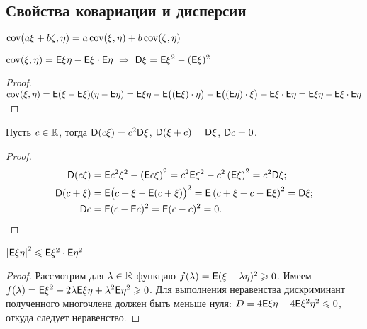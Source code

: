 \subsection*{Свойства ковариации и дисперсии}
\setcounter{property}{0}
\begin{property}
	$\operatorname{cov}( a \xi + b \zeta, \eta ) = a \operatorname{cov} (\xi, \eta) + b \operatorname{cov} (\zeta, \eta)$
\end{property}
\begin{property}
	$\operatorname{cov}( \xi,  \eta ) = \mathsf{E} \xi \eta - \mathsf{E} \xi \cdot \mathsf{E} \eta ~\Rightarrow ~ \mathsf{D} \xi = \mathsf{E} \xi^2 - ( \mathsf{E} \xi )^2$
	\begin{proof}
		$\operatorname{cov} (\xi, \eta ) = \mathsf{E} (\xi - \mathsf{E} \xi)( \eta - \mathsf{E} \eta) = \mathsf{E} \xi \eta - \mathsf{E} \big( ( \mathsf{E} \xi ) \cdot \eta \big) - \mathsf{E} \big( (\mathsf{E} \eta ) \cdot \xi \big) + \mathsf{E} \xi \cdot \mathsf{E} \eta = \mathsf{E} \xi \eta - \mathsf{E} \xi \cdot \mathsf{E} \eta $
	\end{proof}
\end{property}
\begin{property}
	Пусть $c \in \mathbb{R}$, тогда $\mathsf{D} (c \xi ) = c^2 \mathsf{D} \xi$, $\mathsf{D} (\xi + c ) =  \mathsf{D} \xi$, $\mathsf{D} c = 0$.
	\begin{proof}
		\vspace{-2pc}
		\begin{align*}
			\mathsf{D} (c \xi ) &= \mathsf{E} c^2 \xi^2 - \left( \mathsf{E} c \xi \right)^2 = c^2 \mathsf{E} \xi^2 - c^2 \left( \mathsf{E} \xi \right)^2 = c^2 \mathsf{D} \xi;\\
			\mathsf{D} ( c + \xi ) &= \mathsf{E} \big( c + \xi - \mathsf{E} ( c + \xi ) \big)^2 = \mathsf{E} \left( c + \xi - c - \mathsf{E} \xi  \right)^2 = \mathsf{D} \xi; \\
			\mathsf{D} c &= \mathsf{E} (c - \mathsf{E} c )^2 = \mathsf{E} (c - c)^2 = 0. \qedhere
		\end{align*} 
	\end{proof}
\end{property}
\begin{property}
	$\left| \mathsf{E} \xi \eta \right|^2 \leqslant \mathsf{E} \xi^2 \cdot \mathsf{E} \eta^2$
	\begin{proof}
		Рассмотрим для $\lambda \in \mathbb{R}$ функцию $f( \lambda ) = \mathsf{E} (\xi - \lambda \eta)^2 \geqslant 0$. Имеем $f( \lambda ) = \mathsf{E} \xi^2 + 2 \lambda \mathsf{E} \xi \eta + \lambda^2 \mathsf{E} \eta^2 \geqslant 0$. Для выполнения неравенства дискриминант  полученного многочлена должен быть меньше нуля: $D = 4 \mathsf{E} \xi \eta - 4 \mathsf{E} \xi^2 \eta^2 \leqslant 0$, откуда следует неравенство.
	\end{proof}
\end{property}
